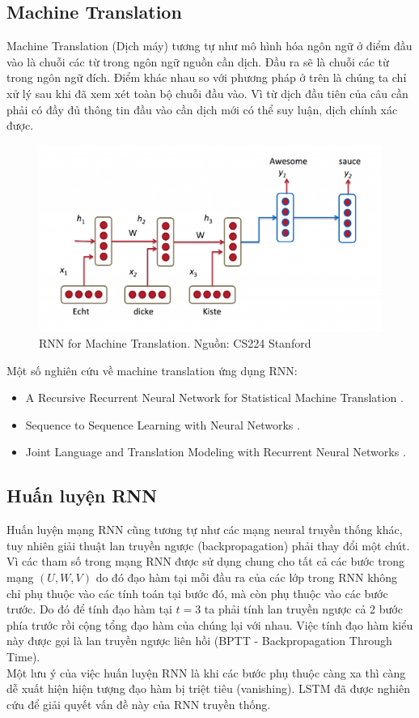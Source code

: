 \documentclass[12pt]{extarticle}
\newcommand{\<}{\langle}
\renewcommand{\>}{\rangle}
\theoremstyle{definition}
\begin{document}
\subsection{Machine Translation}
Machine Translation (Dịch máy) tương tự như mô hình hóa ngôn ngữ ở điểm đầu vào là chuỗi các từ trong ngôn ngữ nguồn cần dịch. Đầu ra sẽ là chuỗi các từ trong ngôn ngữ đích. Điểm khác nhau so với phương pháp ở trên là chúng ta chỉ xử lý sau khi đã xem xét toàn bộ chuỗi đầu vào. Vì từ dịch đầu tiên của câu cần phải có đầy đủ thông tin đầu vào cần dịch mới có thể suy luận, dịch chính xác được.
\begin{figure}[h]
    \centering
    \includegraphics[scale = 0.5]{rnn-machine-translation.png}
    \caption{RNN for Machine Translation. Nguồn: CS224 Stanford}
    \label{fig:fig2}
\end{figure}
Một số nghiên cứu về machine translation ứng dụng RNN:
\begin{itemize}
    \item A Recursive Recurrent Neural Network for Statistical Machine Translation \cite{LiuYLZ14}.
    \item Sequence to Sequence Learning with Neural Networks \cite{SutskeverVL14}.
    \item Joint Language and Translation Modeling with Recurrent Neural Networks \cite{AuliGQZ13}.
\end{itemize}

\subsection{Huấn luyện RNN}
Huấn luyện mạng RNN cũng tương tự như các mạng neural truyền thống khác, tuy nhiên giải thuật lan truyền ngược (backpropagation) phải thay đổi một chút. Vì các tham số trong mạng RNN được sử dụng chung cho tất cả các bước trong mạng $(U, W, V)$ do đó đạo hàm tại mỗi đầu ra của các lớp trong RNN không chỉ phụ thuộc vào các tính toán tại bước đó, mà còn phụ thuộc vào các bước trước. Do đó để tính đạo hàm tại $t=3$ ta phải tính lan truyền ngược cả 2 bước phía trước rồi cộng tổng đạo hàm của chúng lại với nhau. Việc tính đạo hàm kiểu này được gọi là lan truyền ngược liên hồi (BPTT - Backpropagation Through Time).\\
Một lưu ý của việc huấn luyện RNN là khi các bước phụ thuộc càng xa thì càng dễ xuất hiện hiện tượng đạo hàm bị triệt tiêu (vanishing). LSTM đã được nghiên cứu để giải quyết vấn đề này của RNN truyền thống.

\printbibliography
\end{document}
